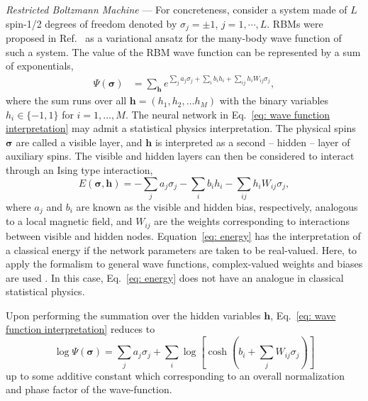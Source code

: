 \documentclass[aps,prl,twocolumn,amsmath,amssymb,superscriptaddress,floatfix]{revtex4-1}
\newcommand{\bs}[1]{\boldsymbol{#1}}
\begin{document}
\textit{Restricted Boltzmann Machine} ---
For concreteness, consider a system made of $L$ spin-1/2 degrees of freedom denoted by $\sigma_j=\pm 1$, $j=1,\cdots, L$.
RBMs were proposed in Ref.~ as a variational ansatz for the many-body wave function of such a system.
The value of the RBM wave function can be represented by a sum of exponentials,
\begin{equation}
\begin{split}
\Psi(\boldsymbol{\sigma}) &= \sum_{\boldsymbol{h}} e^{\sum_{j} a_{j}\sigma_{j} + \sum_{i} b_{i}h_{i} + \sum_{ij} h_{i}W_{ij}\sigma_{j}},
\end{split}
\label{eq: wave function interpretation}
\end{equation}
where the sum runs over all $\bs{h}=(h_1, h_2, \dots h_M)$ with the binary variables $h_i \in\lbrace -1, 1 \rbrace$ for $i=1,\dots,M$.
The neural network in Eq.~\eqref{eq: wave function interpretation} may admit a statistical physics interpretation. The physical spins $\boldsymbol{\sigma}$ are called a visible layer, and $\bs{h}$ is interpreted as a second -- hidden -- layer of auxiliary spins.
The visible and hidden layers can then be considered to interact through an Ising type interaction,
\begin{equation}
E(\boldsymbol{\sigma}, \boldsymbol{h}) = -\sum_{j} a_{j}\sigma_{j} - \sum_{i} b_{i}h_{i} - \sum_{ij} h_{i}W_{ij}\sigma_{j},
\label{eq: energy}
\end{equation}
where $a_{j}$ and $b_{i}$ are known as the visible and hidden bias, respectively, analogous to a local magnetic field, and $W_{ij}$ are the weights corresponding to interactions between visible and hidden nodes.
Equation~\eqref{eq: energy} has the interpretation of a classical energy if the network parameters are taken to be real-valued. Here, to apply the formalism to general wave functions, complex-valued weights and biases are used \cite{Carleo2017}. In this case, Eq.~\eqref{eq: energy} does not have an analogue in classical statistical physics. 

Upon performing the summation over the hidden variables $\boldsymbol{h}$, Eq.~\eqref{eq: wave function interpretation} reduces to
\begin{equation} \label{eq: log rbm}
\log\Psi(\boldsymbol{\sigma}) = \sum_{j} a_{j}\sigma_{j} + \sum_{i} \log \left[\cosh\left( b_{i} + \sum_{j} W_{ij}\sigma_{j} \right) \right]
\end{equation}
up to some additive constant which corresponding to an overall normalization and phase factor of the wave-function.
\end{document}
